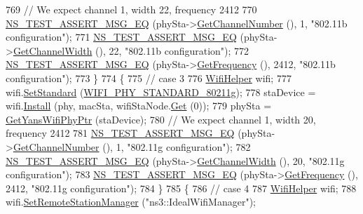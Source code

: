 \begin{DoxyCode}
769     \textcolor{comment}{// We expect channel 1, width 22, frequency 2412}
770     \hyperlink{group__testing_ga2a9d78cffb3db8e867c35fff0b698cf5}{NS\_TEST\_ASSERT\_MSG\_EQ} (phySta->\hyperlink{classns3_1_1WifiPhy_a5cf0ccf06109ace61db51c83e91b7e8d}{GetChannelNumber} (), 1, \textcolor{stringliteral}{"802.11b
       configuration"});
771     \hyperlink{group__testing_ga2a9d78cffb3db8e867c35fff0b698cf5}{NS\_TEST\_ASSERT\_MSG\_EQ} (phySta->\hyperlink{classns3_1_1WifiPhy_a4a5d5009b3b3308f2baeed42a2007189}{GetChannelWidth} (), 22, \textcolor{stringliteral}{"802.11b
       configuration"});
772     \hyperlink{group__testing_ga2a9d78cffb3db8e867c35fff0b698cf5}{NS\_TEST\_ASSERT\_MSG\_EQ} (phySta->\hyperlink{classns3_1_1WifiPhy_ad2508d94faf22d690d6b8b4367934fd1}{GetFrequency} (), 2412, \textcolor{stringliteral}{"802.11b
       configuration"});
773   \}
774   \{
775     \textcolor{comment}{// case 3}
776     \hyperlink{classns3_1_1WifiHelper}{WifiHelper} wifi;
777     wifi.\hyperlink{classns3_1_1WifiHelper_aa54f3e61527ef8de318d310045bc5dfd}{SetStandard} (\hyperlink{group__wifi_gga1299834f4e1c615af3ca738033b76a49aeda6d90f260393ce003ec4765d8100af}{WIFI\_PHY\_STANDARD\_80211g});
778     staDevice = wifi.\hyperlink{classns3_1_1WifiHelper_a451b3d33fa1497c22f06c5451f57a127}{Install} (phy, macSta, wifiStaNode.\hyperlink{classns3_1_1NodeContainer_a9ed96e2ecc22e0f5a3d4842eb9bf90bf}{Get} (0));
779     phySta = \hyperlink{classSetChannelFrequencyTest_aa30a0a39f98c2d825152681ba8b9f4e1}{GetYansWifiPhyPtr} (staDevice);
780     \textcolor{comment}{// We expect channel 1, width 20, frequency 2412}
781     \hyperlink{group__testing_ga2a9d78cffb3db8e867c35fff0b698cf5}{NS\_TEST\_ASSERT\_MSG\_EQ} (phySta->\hyperlink{classns3_1_1WifiPhy_a5cf0ccf06109ace61db51c83e91b7e8d}{GetChannelNumber} (), 1, \textcolor{stringliteral}{"802.11g
       configuration"});
782     \hyperlink{group__testing_ga2a9d78cffb3db8e867c35fff0b698cf5}{NS\_TEST\_ASSERT\_MSG\_EQ} (phySta->\hyperlink{classns3_1_1WifiPhy_a4a5d5009b3b3308f2baeed42a2007189}{GetChannelWidth} (), 20, \textcolor{stringliteral}{"802.11g
       configuration"});
783     \hyperlink{group__testing_ga2a9d78cffb3db8e867c35fff0b698cf5}{NS\_TEST\_ASSERT\_MSG\_EQ} (phySta->\hyperlink{classns3_1_1WifiPhy_ad2508d94faf22d690d6b8b4367934fd1}{GetFrequency} (), 2412, \textcolor{stringliteral}{"802.11g
       configuration"});
784   \}
785   \{
786     \textcolor{comment}{// case 4}
787     \hyperlink{classns3_1_1WifiHelper}{WifiHelper} wifi;
788     wifi.\hyperlink{classns3_1_1WifiHelper_a3d01b178aeb2de246ab5a3aa5638ce24}{SetRemoteStationManager} (\textcolor{stringliteral}{"ns3::IdealWifiManager"});

\end{DoxyCode}
